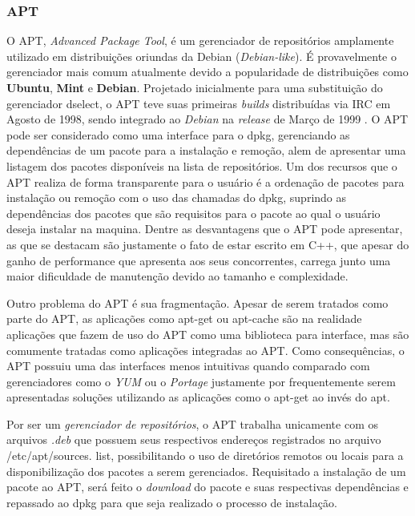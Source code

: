 \subsubsection{APT} %
\label{subs:apt}

O {\code APT}, \textit{Advanced Package Tool}, é um gerenciador de repositórios  amplamente utilizado em distribuições oriundas da Debian (\textit{Debian-like}).
É provavelmente o gerenciador mais comum atualmente devido a popularidade de distribuições como \textbf{Ubuntu}, \textbf{Mint} e \textbf{Debian}.
Projetado inicialmente para uma substituição do gerenciador {\code dselect}, o APT teve suas primeiras \textit{builds} distribuídas via IRC em Agosto de 1998,  sendo integrado ao \textit{Debian} na \textit{release} de Março de 1999 \cite{garbee2008brief}. O  APT pode ser considerado como uma interface para o {\code dpkg}, gerenciando as dependências de um pacote para a instalação e remoção, alem de apresentar uma listagem dos pacotes disponíveis na lista de repositórios. Um dos recursos que o APT realiza de forma transparente para o usuário é a ordenação de pacotes para instalação ou remoção com o uso das chamadas do {\code dpkg}, suprindo as dependências dos pacotes que são requisitos para o pacote ao qual o usuário deseja instalar na maquina. Dentre as desvantagens que o APT pode apresentar, as que se destacam são justamente o fato de estar escrito em C++, que apesar do ganho de performance que apresenta aos seus concorrentes, carrega junto uma maior dificuldade de manutenção devido ao tamanho e complexidade. 

Outro problema do APT é sua fragmentação. Apesar de serem tratados como parte do APT, as aplicações como {\code apt-get} ou {\code apt-cache} são na realidade aplicações que fazem de uso do APT como uma biblioteca para interface, mas são comumente tratadas como aplicações integradas ao APT. Como consequências, o APT possuiu uma das interfaces menos intuitivas quando comparado com gerenciadores como o \textit{YUM} ou o \textit{Portage} justamente por frequentemente serem apresentadas soluções utilizando as aplicações como o {\code apt-get} ao invés do {\code apt}.

Por ser um \textit{gerenciador de repositórios}, o {\code APT} trabalha unicamente com os arquivos \textit{.deb} que possuem seus respectivos endereços registrados no arquivo {\code/etc/apt/sources. list}, possibilitando o uso de diretórios remotos ou locais para a disponibilização dos pacotes a serem gerenciados. Requisitado a instalação de um pacote ao {\code APT}, será feito o \textit{download} do pacote e  suas respectivas dependências e repassado ao {\code dpkg} para que seja realizado o processo de instalação.

